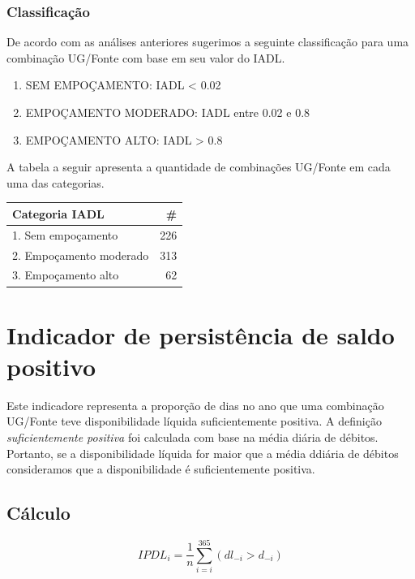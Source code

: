\documentclass[
]{book}
\providecommand{\tightlist}{%
  \setlength{\itemsep}{0pt}\setlength{\parskip}{0pt}}
\begin{document}
\hypertarget{classificauxe7uxe3o}{%
\subsubsection{Classificação}\label{classificauxe7uxe3o}}

De acordo com as análises anteriores sugerimos a seguinte classificação para uma combinação UG/Fonte com base em seu valor do IADL.

\begin{enumerate}
\def\labelenumi{\arabic{enumi}.}
\tightlist
\item
  SEM EMPOÇAMENTO: IADL \textless{} 0.02
\item
  EMPOÇAMENTO MODERADO: IADL entre 0.02 e 0.8
\item
  EMPOÇAMENTO ALTO: IADL \textgreater{} 0.8
\end{enumerate}

A tabela a seguir apresenta a quantidade de combinações UG/Fonte em cada uma das categorias.

\begin{tabular}{l|r}
\hline
Categoria IADL & \#\\
\hline
1. Sem empoçamento & 226\\
\hline
2. Empoçamento moderado & 313\\
\hline
3. Empoçamento alto & 62\\
\hline
\end{tabular}

\hypertarget{indicador-de-persistuxeancia-de-saldo-positivo}{%
\section{Indicador de persistência de saldo positivo}\label{indicador-de-persistuxeancia-de-saldo-positivo}}

Este indicadore representa a proporção de dias no ano que uma combinação UG/Fonte teve disponibilidade líquida suficientemente
positiva. A definição \emph{suficientemente positiva} foi calculada com base na média diária de débitos. Portanto, se a disponibilidade líquida for maior que a média ddiária de débitos consideramos que a disponibilidade é suficientemente positiva.

\hypertarget{cuxe1lculo-1}{%
\subsection{Cálculo}\label{cuxe1lculo-1}}

\[IPDL_i = \frac{1}{n}\sum_{i=i}^{365}(dl_{-i} > d_{-i})\]
\end{document}
